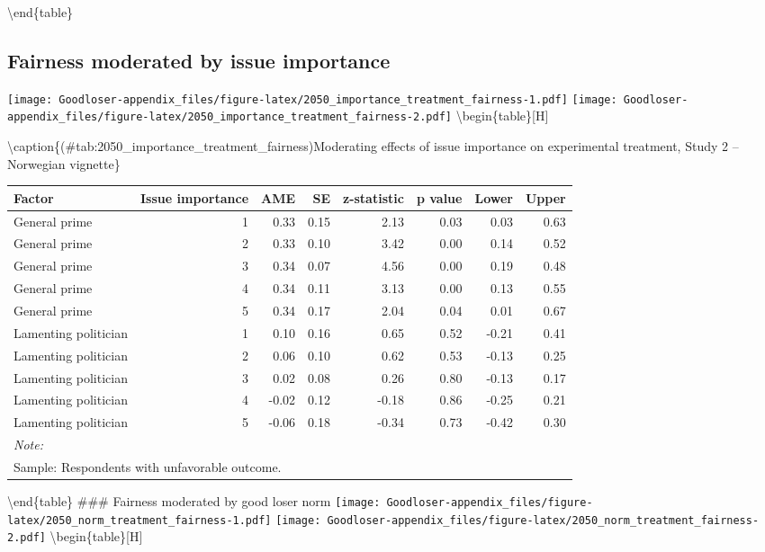 \documentclass[
]{book}
\begin{document}
\textbackslash end\{table\}

\hypertarget{fairness-moderated-by-issue-importance}{%
\subsection{Fairness moderated by issue importance}\label{fairness-moderated-by-issue-importance}}

\texttt{[image: Goodloser-appendix\_files/figure-latex/2050\_importance\_treatment\_fairness-1.pdf]} \texttt{[image: Goodloser-appendix\_files/figure-latex/2050\_importance\_treatment\_fairness-2.pdf]} \textbackslash begin\{table\}{[}H{]}

\textbackslash caption\{(\#tab:2050\_importance\_treatment\_fairness)Moderating effects of issue importance on experimental treatment, Study 2 -- Norwegian vignette\}
\centering

\begin{tabular}[t]{lrrrrrrr}
\toprule
Factor & Issue importance & AME & SE & z-statistic & p value & Lower & Upper\\
\midrule
General prime & 1 & 0.33 & 0.15 & 2.13 & 0.03 & 0.03 & 0.63\\
General prime & 2 & 0.33 & 0.10 & 3.42 & 0.00 & 0.14 & 0.52\\
General prime & 3 & 0.34 & 0.07 & 4.56 & 0.00 & 0.19 & 0.48\\
General prime & 4 & 0.34 & 0.11 & 3.13 & 0.00 & 0.13 & 0.55\\
General prime & 5 & 0.34 & 0.17 & 2.04 & 0.04 & 0.01 & 0.67\\
\addlinespace
Lamenting politician & 1 & 0.10 & 0.16 & 0.65 & 0.52 & -0.21 & 0.41\\
Lamenting politician & 2 & 0.06 & 0.10 & 0.62 & 0.53 & -0.13 & 0.25\\
Lamenting politician & 3 & 0.02 & 0.08 & 0.26 & 0.80 & -0.13 & 0.17\\
Lamenting politician & 4 & -0.02 & 0.12 & -0.18 & 0.86 & -0.25 & 0.21\\
Lamenting politician & 5 & -0.06 & 0.18 & -0.34 & 0.73 & -0.42 & 0.30\\
\bottomrule
\multicolumn{8}{l}{\textit{Note: }}\\
\multicolumn{8}{l}{Sample: Respondents with unfavorable outcome.}\\
\end{tabular}

\textbackslash end\{table\}
\#\#\# Fairness moderated by good loser norm
\texttt{[image: Goodloser-appendix\_files/figure-latex/2050\_norm\_treatment\_fairness-1.pdf]} \texttt{[image: Goodloser-appendix\_files/figure-latex/2050\_norm\_treatment\_fairness-2.pdf]} \textbackslash begin\{table\}{[}H{]}
\end{document}
